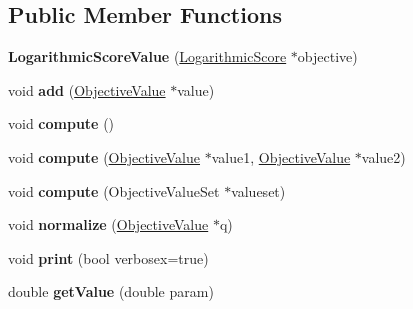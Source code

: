 \subsection*{Public Member Functions}
\begin{DoxyCompactItemize}
\item 
\hypertarget{classLogarithmicScoreValue_a64f4d9159479c0db64eacda76b0df64b}{{\bfseries Logarithmic\-Score\-Value} (\hyperlink{classLogarithmicScore}{Logarithmic\-Score} $\ast$objective)}\label{classLogarithmicScoreValue_a64f4d9159479c0db64eacda76b0df64b}

\item 
\hypertarget{classLogarithmicScoreValue_a99e54d901543fd942ea6a7a845ec8e66}{void {\bfseries add} (\hyperlink{classObjectiveValue}{Objective\-Value} $\ast$value)}\label{classLogarithmicScoreValue_a99e54d901543fd942ea6a7a845ec8e66}

\item 
\hypertarget{classLogarithmicScoreValue_afc9648a163c54b6b59cca894ba38386a}{void {\bfseries compute} ()}\label{classLogarithmicScoreValue_afc9648a163c54b6b59cca894ba38386a}

\item 
\hypertarget{classLogarithmicScoreValue_a649b92d944eb29e241b0106382eb57ae}{void {\bfseries compute} (\hyperlink{classObjectiveValue}{Objective\-Value} $\ast$value1, \hyperlink{classObjectiveValue}{Objective\-Value} $\ast$value2)}\label{classLogarithmicScoreValue_a649b92d944eb29e241b0106382eb57ae}

\item 
\hypertarget{classLogarithmicScoreValue_a716c56f130aa42bfc296b01950fa08c7}{void {\bfseries compute} (Objective\-Value\-Set $\ast$valueset)}\label{classLogarithmicScoreValue_a716c56f130aa42bfc296b01950fa08c7}

\item 
\hypertarget{classLogarithmicScoreValue_a4213f6cbf380cfec520b1fd5dbcf193b}{void {\bfseries normalize} (\hyperlink{classObjectiveValue}{Objective\-Value} $\ast$q)}\label{classLogarithmicScoreValue_a4213f6cbf380cfec520b1fd5dbcf193b}

\item 
\hypertarget{classLogarithmicScoreValue_a21117c78c050f36c7264705ccbad349a}{void {\bfseries print} (bool verbosex=true)}\label{classLogarithmicScoreValue_a21117c78c050f36c7264705ccbad349a}

\item 
\hypertarget{classLogarithmicScoreValue_ac33488ba0ec0dd4ad2291607d87ecd90}{double {\bfseries get\-Value} (double param)}\label{classLogarithmicScoreValue_ac33488ba0ec0dd4ad2291607d87ecd90}

\end{DoxyCompactItemize}
